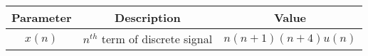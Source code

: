 \begin{tabular}{|c|c|c|}
\hline
\textbf{Parameter} & \textbf{Description} & \textbf{Value} \\
\hline
$x(n)$ & $n^{th}$ term of discrete signal & $n(n+1)(n+4)u(n)$\\
\hline
\end{tabular}
